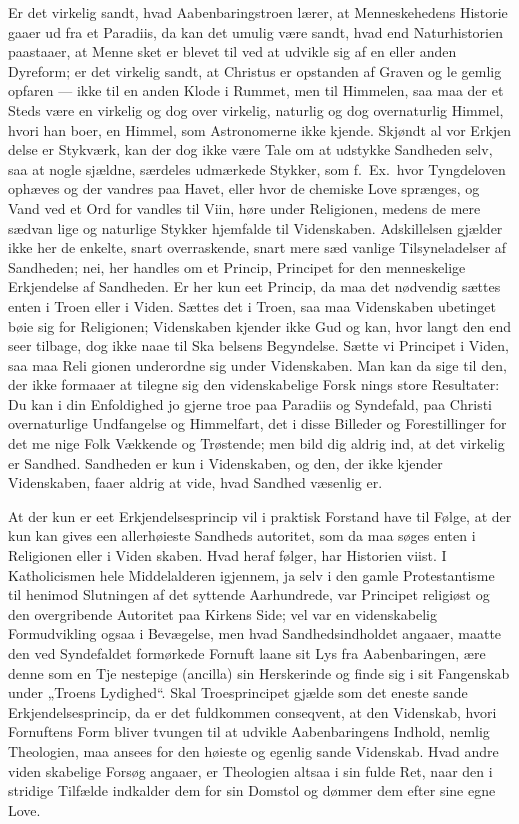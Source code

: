 \documentclass[12pt,a4paper]{article}
\newcommand{\opage}[1]{\marginnote{\footnotesize\textit{[#1]}}}
\begin{document}
Er det virkelig sandt, hvad Aabenbaringstroen lærer, at
Menneskehedens Historie gaaer ud fra et Paradiis, da kan det
umulig være sandt, hvad end Naturhistorien paastaaer, at Menne\-%
sket er blevet til ved at udvikle sig af en eller anden Dyreform;
er det virkelig sandt, at Christus er opstanden af Graven og le\-%
gemlig opfaren --- ikke til en anden Klode i Rummet, men til
Himmelen, saa maa der et Steds være en virkelig og dog over\-%
virkelig, naturlig og dog overnaturlig Himmel, hvori han boer, en
Himmel, som Astronomerne ikke kjende. Skjøndt al vor Erkjen\-%
delse er Stykværk, kan der dog ikke være Tale om at udstykke
Sandheden selv, saa at nogle sjældne, særdeles udmærkede Stykker,
som f.\ Ex.\ hvor Tyngdeloven ophæves og der vandres paa Havet,
eller hvor de chemiske Love sprænges, og Vand ved et Ord for\-%
vandles til Viin, høre under Religionen, medens de mere sædvan\-%
lige og naturlige Stykker hjemfalde til Videnskaben. Adskillelsen
gjælder ikke her de enkelte, snart overraskende, snart mere sæd\-%
vanlige Tilsyneladelser af Sandheden; nei, her handles om et
Princip, Principet for den menneskelige Erkjendelse af Sandheden.
Er her kun eet Princip, da maa det nødvendig sættes enten i
Troen eller i Viden. Sættes det i Troen, saa maa Videnskaben
ubetinget bøie sig for Religionen; Videnskaben kjender ikke Gud
og kan, hvor langt den end seer tilbage, dog ikke naae til Ska\-%
belsens Begyndelse. Sætte vi Principet i Viden, saa maa Reli\-%
gionen underordne sig under Videnskaben. Man kan da sige til
den, der ikke formaaer at tilegne sig den videnskabelige Forsk\-%
nings store Resultater: Du kan i din Enfoldighed jo gjerne troe
paa Paradiis og Syndefald, paa Christi overnaturlige Undfangelse
og Himmelfart, det i disse Billeder og Forestillinger for det me\-%
nige Folk Vækkende og Trøstende; men bild dig aldrig ind, at
det virkelig er Sandhed. Sandheden er kun i Videnskaben, og
den, der ikke kjender Videnskaben, faaer aldrig at vide, hvad
Sandhed væsenlig er.

At der kun er eet Erkjendelsesprincip vil i praktisk Forstand
\opage{13}have til Følge, at der kun kan gives een allerhøieste Sandheds\-%
autoritet, som da maa søges enten i Religionen eller i Viden\-%
skaben. Hvad heraf følger, har Historien viist. I Katholicismen
hele Middelalderen igjennem, ja selv i den gamle Protestantisme
til henimod Slutningen af det syttende Aarhundrede, var Principet
religiøst og den overgribende Autoritet paa Kirkens Side; vel var
en videnskabelig Formudvikling ogsaa i Bevægelse, men hvad
Sandhedsindholdet angaaer, maatte den ved Syndefaldet formørkede
Fornuft laane sit Lys fra Aabenbaringen, ære denne som en Tje\-%
nestepige (ancilla) sin Herskerinde og finde sig i sit Fangenskab
under „Troens Lydighed“. Skal Troesprincipet gjælde som det
eneste sande Erkjendelsesprincip, da er det fuldkommen conseqvent,
at den Videnskab, hvori Fornuftens Form bliver tvungen til at
udvikle Aabenbaringens Indhold, nemlig Theologien, maa ansees
for den høieste og egenlig sande Videnskab. Hvad andre viden\-%
skabelige Forsøg angaaer, er Theologien altsaa i sin fulde Ret,
naar den i stridige Tilfælde indkalder dem for sin Domstol og
dømmer dem efter sine egne Love.
\end{document}
